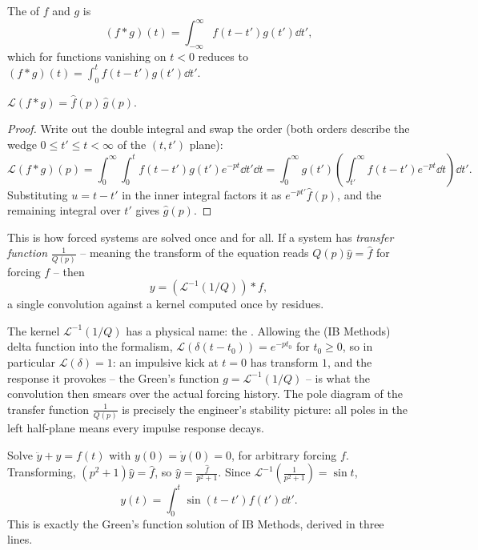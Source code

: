 \begin{definition}[Convolution]
	The  of $f$ and $g$ is
	$$
	(f * g)(t) = \int_{-\infty}^\infty f(t - t') g(t') \dd t',
	$$
	which for functions vanishing on $t < 0$ reduces to $\displaystyle (f*g)(t) = \int_0^t f(t - t')g(t') \dd t'$.
\end{definition}

\begin{theorem}
	$\mathcal L(f * g) = \hat f(p)\, \hat g(p)$.
\end{theorem}
\begin{proof}
	Write out the double integral and swap the order (both orders describe the wedge $0 \leq t' \leq t < \infty$ of the $(t, t')$ plane):
	$$
	\mathcal L(f * g)(p) = \int_0^\infty \int_0^t f(t - t')g(t') e^{-pt}\dd t' \dd t = \int_0^\infty g(t') \left(\int_{t'}^\infty f(t - t') e^{-pt} \dd t\right) \dd t'.
	$$
	Substituting $u = t - t'$ in the inner integral factors it as $e^{-pt'} \hat f(p)$, and the remaining integral over $t'$ gives $\hat g(p)$.
\end{proof}

This is how forced systems are solved once and for all. If a system has \emph{transfer function} $\frac{1}{Q(p)}$ -- meaning the transform of the equation reads $Q(p) \hat y = \hat f$ for forcing $f$ -- then
$$
y = (\mathcal{L}^{-1}(1/Q)) * f,
$$
a single convolution against a kernel computed once by residues.

\begin{remark}
	The kernel $\mathcal{L}^{-1}(1/Q)$ has a physical name: the . Allowing the (IB Methods) delta function into the formalism, $\mathcal L(\delta(t - t_0)) = e^{-p t_0}$ for $t_0 \geq 0$, so in particular $\mathcal L(\delta) = 1$: an impulsive kick at $t = 0$ has transform $1$, and the response it provokes -- the Green's function $g = \mathcal{L}^{-1}(1/Q)$ -- is what the convolution then smears over the actual forcing history. The pole diagram of the transfer function $\frac{1}{Q(p)}$ is precisely the engineer's stability picture: all poles in the left half-plane means every impulse response decays.
\end{remark}

\begin{example}
	Solve $\ddot y + y = f(t)$ with $y(0) = \dot y(0) = 0$, for arbitrary forcing $f$. Transforming, $(p^2 + 1)\hat y = \hat f$, so $\hat y = \frac{\hat f}{p^2 + 1}$. Since $\mathcal{L}^{-1}\left(\frac{1}{p^2+1}\right) = \sin t$,
	$$
	y(t) = \int_0^t \sin(t - t') f(t') \dd t'.
	$$
	This is exactly the Green's function solution of IB Methods, derived in three lines.
\end{example}

